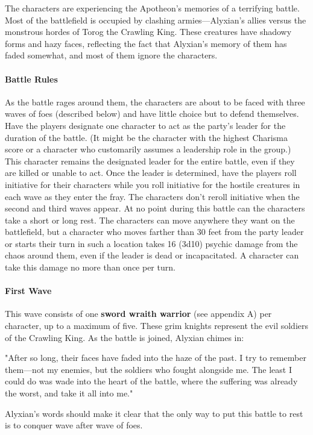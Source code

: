 \documentclass[10pt,a4,twoside,twocolumn,openany,nodeprecatedcode]{dndbook}
\begin{document}
The characters are experiencing the Apotheon's memories of a terrifying battle. Most of the battlefield is occupied by clashing armies—Alyxian's allies versus the monstrous hordes of Torog the Crawling King. These creatures have shadowy forms and hazy faces, reflecting the fact that Alyxian's memory of them has faded somewhat, and most of them ignore the characters.
\paragraph{Battle Rules}
As the battle rages around them, the characters are about to be faced with three waves of foes (described below) and have little choice but to defend themselves. Have the players designate one character to act as the party's leader for the duration of the battle. (It might be the character with the highest Charisma score or a character who customarily assumes a leadership role in the group.) This character remains the designated leader for the entire battle, even if they are killed or unable to act. Once the leader is determined, have the players roll initiative for their characters while you roll initiative for the hostile creatures in each wave as they enter the fray. The characters don't reroll initiative when the second and third waves appear. At no point during this battle can the characters take a short or long rest.
The characters can move anywhere they want on the battlefield, but a character who moves farther than 30 feet from the party leader or starts their turn in such a location takes 16 (3d10) psychic damage from the chaos around them, even if the leader is dead or incapacitated. A character can take this damage no more than once per turn.
\paragraph{First Wave}
This wave consists of one \textbf{sword wraith warrior} (see appendix A) per character, up to a maximum of five. These grim knights represent the evil soldiers of the Crawling King. As the battle is joined, Alyxian chimes in:
\begin{DndReadAloud}{}
"After so long, their faces have faded into the haze of the past. I try to remember them—not my enemies, but the soldiers who fought alongside me. The least I could do was wade into the heart of the battle, where the suffering was already the worst, and take it all into me."
\end{DndReadAloud}

Alyxian's words should make it clear that the only way to put this battle to rest is to conquer wave after wave of foes.
\end{document}
